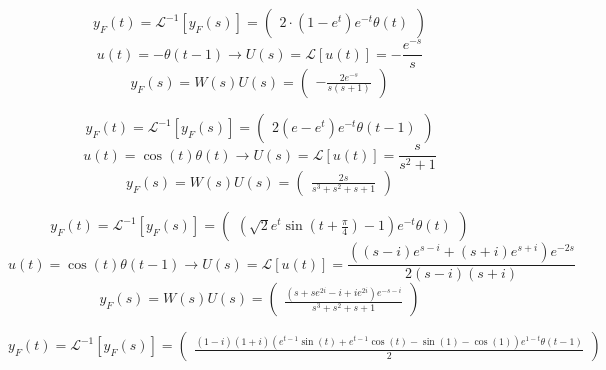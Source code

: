 \documentclass{article}
\begin{document}
\[ y_F(t) = \mathcal{L}^{-1}[y_F(s)] = \left(\begin{matrix}2 \cdot \left(1 - e^{t}\right) e^{- t} \theta\left(t\right)\end{matrix}\right) \]
\[ u(t) = - \theta\left(t - 1\right) \to U(s) = \mathcal{L}[u(t)] = - \frac{e^{- s}}{s} \]
\[ y_F(s) = W(s) U(s)  = \left(\begin{matrix}- \frac{2 e^{- s}}{s \left(s + 1\right)}\end{matrix}\right)\] 

\[ y_F(t) = \mathcal{L}^{-1}[y_F(s)] = \left(\begin{matrix}2 \left(e - e^{t}\right) e^{- t} \theta\left(t - 1\right)\end{matrix}\right) \]
\[ u(t) = \cos{\left(t \right)} \theta\left(t\right) \to U(s) = \mathcal{L}[u(t)] = \frac{s}{s^{2} + 1} \]
\[ y_F(s) = W(s) U(s)  = \left(\begin{matrix}\frac{2 s}{s^{3} + s^{2} + s + 1}\end{matrix}\right)\] 

\[ y_F(t) = \mathcal{L}^{-1}[y_F(s)] = \left(\begin{matrix}\left(\sqrt{2} e^{t} \sin{\left(t + \frac{\pi}{4} \right)} - 1\right) e^{- t} \theta\left(t\right)\end{matrix}\right) \]
\[ u(t) = \cos{\left(t \right)} \theta\left(t - 1\right) \to U(s) = \mathcal{L}[u(t)] = \frac{\left(\left(s - i\right) e^{s - i} + \left(s + i\right) e^{s + i}\right) e^{- 2 s}}{2 \left(s - i\right) \left(s + i\right)} \]
\[ y_F(s) = W(s) U(s)  = \left(\begin{matrix}\frac{\left(s + s e^{2 i} - i + i e^{2 i}\right) e^{- s - i}}{s^{3} + s^{2} + s + 1}\end{matrix}\right)\] 

\[ y_F(t) = \mathcal{L}^{-1}[y_F(s)] = \left(\begin{matrix}\frac{\left(1 - i\right) \left(1 + i\right) \left(e^{t - 1} \sin{\left(t \right)} + e^{t - 1} \cos{\left(t \right)} - \sin{\left(1 \right)} - \cos{\left(1 \right)}\right) e^{1 - t} \theta\left(t - 1\right)}{2}\end{matrix}\right) \] 
\end{document}
